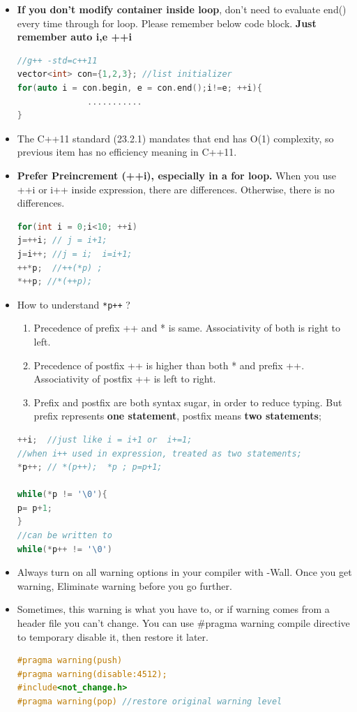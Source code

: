 \documentclass[a4paper,12pt,twoside]{book}
\begin{document}
\begin{itemize}
\item \textbf{If you don't modify container inside loop}, don't need to evaluate end() every time through for loop. Please remember below code block. \textbf{Just remember auto i,e ++i}
\begin{lstlisting}[frame=single, language=c++]
//g++ -std=c++11
vector<int> con={1,2,3}; //list initializer
for(auto i = con.begin, e = con.end();i!=e; ++i){
              ...........
}
\end{lstlisting}

\item The C++11 standard (23.2.1) mandates that end has O(1) complexity, so previous item has no efficiency meaning in C++11.


\item \textbf{Prefer Preincrement (++i), especially in a for loop.}  When you use ++i or i++ inside expression, there are differences. Otherwise, there is no differences.
\begin{lstlisting}[frame=single, language=c++]
for(int i = 0;i<10; ++i)
j=++i; // j = i+1;
j=i++; //j = i;  i=i+1;
++*p;  //++(*p) ;
*++p; //*(++p);
\end{lstlisting}

\item How to understand \texttt{*p++} ?

\begin{enumerate}
    \item Precedence of prefix ++ and * is same. Associativity of both is right to left.
    \item Precedence of postfix ++ is higher than both * and prefix ++. Associativity of postfix ++ is left to right.
    \item Prefix and postfix are both syntax sugar, in order to reduce typing.   But prefix represents \textbf{one statement}, postfix means \textbf{two statements};
\end{enumerate}

\begin{lstlisting}[frame=single, language=c++]
++i;  //just like i = i+1 or  i+=1;
//when i++ used in expression, treated as two statements;
*p++; // *(p++);  *p ; p=p+1;

while(*p != '\0'){
p= p+1;
}
//can be written to
while(*p++ != '\0')
\end{lstlisting}

\item Always turn on all warning options in your compiler with -Wall. Once you get warning, Eliminate warning before you go further.

\item Sometimes, this warning is what you have to, or if warning comes from a header file you can't change. You can use \#pragma warning compile directive to temporary disable it, then restore it later.
\begin{lstlisting}[frame=single, language=c++]
#pragma warning(push)
#pragma warning(disable:4512);
#include<not_change.h>
#pragma warning(pop) //restore original warning level
\end{lstlisting}

\end{itemize}
\end{document}
